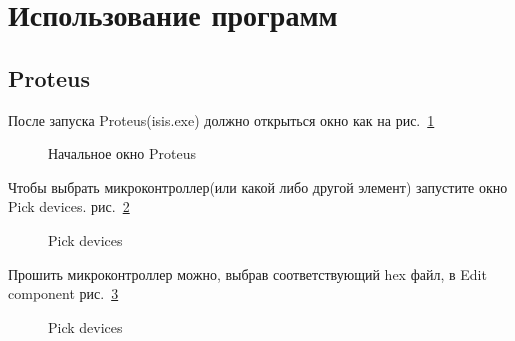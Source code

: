 \documentclass[12pt]{article}
\begin{document}
\section{Использование программ}
\subsection{Proteus}
После запуска Proteus(isis.exe) должно открыться окно как на рис.~\ref{p1} 
\begin{figure}[H]
\caption{Начальное окно Proteus}
\label{p1}
\end{figure}
Чтобы выбрать микроконтроллер(или какой либо другой элемент) запустите окно Pick devices. рис.~\ref{p2} 
\begin{figure}[H]
\caption{Pick devices}
\label{p2}
\end{figure}
Прошить микроконтроллер можно, выбрав соответствующий hex файл, в Edit component рис.~\ref{p3} 
\begin{figure}[H] 
\caption{Pick devices}
\label{p3}
\end{figure}
\end{document}
